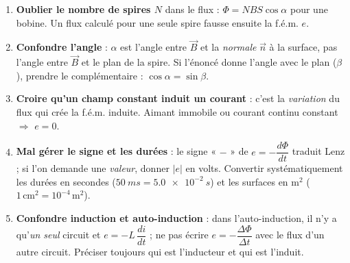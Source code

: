 \documentclass[11pt]{article}
\begin{document}
\begin{attention}
\begin{enumerate}
\item \textbf{Oublier le nombre de spires $N$} dans le flux : $\Phi = NBS\cos\alpha$ pour une bobine. Un flux calculé pour une seule spire fausse ensuite la f.é.m. $e$.
\item \textbf{Confondre l'angle} : $\alpha$ est l'angle entre $\vec{B}$ et la \emph{normale} $\vec{n}$ à la surface, pas l'angle entre $\vec{B}$ et le plan de la spire. Si l'énoncé donne l'angle avec le plan ($\beta$), prendre le complémentaire : $\cos\alpha = \sin\beta$.
\item \textbf{Croire qu'un champ constant induit un courant} : c'est la \emph{variation} du flux qui crée la f.é.m. induite. Aimant immobile ou courant continu constant $\Rightarrow$ $e = 0$.
\item \textbf{Mal gérer le signe et les durées} : le signe « $-$ » de $e = -\dfrac{d\Phi}{dt}$ traduit Lenz ; si l'on demande une \emph{valeur}, donner $|e|$ en volts. Convertir systématiquement les durées en secondes ($\SI{50}{ms} = \SI{5,0e-2}{s}$) et les surfaces en $\mathrm{m}^2$ ($1\,\mathrm{cm}^2 = 10^{-4}\,\mathrm{m}^2$).
\item \textbf{Confondre induction et auto-induction} : dans l'auto-induction, il n'y a qu'\emph{un seul} circuit et $e = -L\,\dfrac{di}{dt}$ ; ne pas écrire $e = -\dfrac{\Delta\Phi}{\Delta t}$ avec le flux d'un autre circuit. Préciser toujours qui est l'inducteur et qui est l'induit.
\end{enumerate}
\end{attention}
\end{document}
